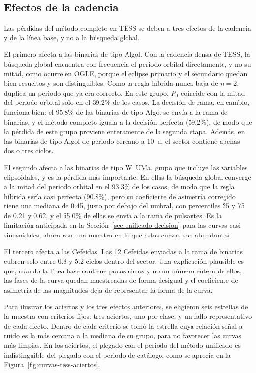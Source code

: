 \documentclass[12pt,letterpaper,oneside]{book}
\begin{document}
\subsection{Efectos de la cadencia}

Las p\'erdidas del m\'etodo completo en TESS se deben a tres efectos de la cadencia y de la l\'inea base, y no a la b\'usqueda global.

El primero afecta a las binarias de tipo Algol. Con la cadencia densa de TESS, la b\'usqueda global encuentra con frecuencia el periodo orbital directamente, y no su mitad, como ocurre en OGLE, porque el eclipse primario y el secundario quedan bien resueltos y son distinguibles. Como la regla h\'ibrida nunca baja de $n=2$, duplica un periodo que ya era correcto. En este grupo, $P_0$ coincide con la mitad del periodo orbital solo en el 39.2\% de los casos. La decisi\'on de rama, en cambio, funciona bien: el 95.8\% de las binarias de tipo Algol se env\'ia a la rama de binarias, y el m\'etodo completo iguala a la decisi\'on perfecta (59.2\%), de modo que la p\'erdida de este grupo proviene enteramente de la segunda etapa. Adem\'as, en las binarias de tipo Algol de periodo cercano a 10~d, el sector contiene apenas dos o tres ciclos.

El segundo afecta a las binarias de tipo W~UMa, grupo que incluye las variables elipsoidales, y es la p\'erdida m\'as importante. En ellas la b\'usqueda global converge a la mitad del periodo orbital en el 93.3\% de los casos, de modo que la regla h\'ibrida ser\'ia casi perfecta (90.8\%), pero su coeficiente de asimetr\'ia corregido tiene una mediana de 0.45, justo por debajo del umbral, con percentiles 25 y 75 de 0.21 y 0.62, y el 55.0\% de ellas se env\'ia a la rama de pulsantes. Es la limitaci\'on anticipada en la Secci\'on~\ref{sec:unificado-decision} para las curvas casi sinusoidales, ahora con una muestra en la que estas curvas son abundantes.

El tercero afecta a las Cefeidas. Las 12 Cefeidas enviadas a la rama de binarias cubren solo entre 0.8 y 5.2 ciclos dentro del sector. Una explicaci\'on plausible es que, cuando la l\'inea base contiene pocos ciclos y no un n\'umero entero de ellos, las fases de la curva quedan muestreadas de forma desigual y el coeficiente de asimetr\'ia de las magnitudes deja de representar la forma de la curva.

Para ilustrar los aciertos y los tres efectos anteriores, se eligieron seis estrellas de la muestra con criterios fijos: tres aciertos, uno por clase, y un fallo representativo de cada efecto. Dentro de cada criterio se tom\'o la estrella cuya relaci\'on se\~nal a ruido es la m\'as cercana a la mediana de su grupo, para no favorecer las curvas m\'as limpias. En los aciertos, el plegado con el periodo del m\'etodo unificado es indistinguible del plegado con el periodo de cat\'alogo, como se aprecia en la Figura~\ref{fig:curvas-tess-aciertos}.
\end{document}

